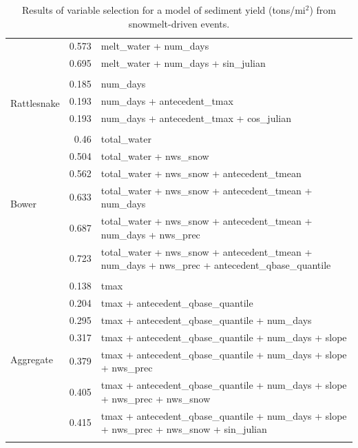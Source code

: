 \documentclass[10pt]{article}
\begin{document}
\begin{table}[h]
\begin{center}
\begin{tabular}{lrl}
 & 0.573 & melt\_water + num\_days\\ 
 & 0.695 & melt\_water + num\_days + sin\_julian\\ 
\vspace{2mm}\\ \multirow{4}{*}{Rattlesnake} & 0.185 & num\_days\\ 
 & 0.193 & num\_days + antecedent\_tmax\\ 
 & 0.193 & num\_days + antecedent\_tmax + cos\_julian\\ 
\vspace{2mm}\\ \multirow{7}{*}{Bower} & 0.46 & total\_water\\ 
 & 0.504 & total\_water + nws\_snow\\ 
 & 0.562 & total\_water + nws\_snow + antecedent\_tmean\\ 
 & 0.633 & total\_water + nws\_snow + antecedent\_tmean + num\_days\\ 
 & 0.687 & total\_water + nws\_snow + antecedent\_tmean + num\_days + nws\_prec\\ 
 & 0.723 & total\_water + nws\_snow + antecedent\_tmean + num\_days + nws\_prec + antecedent\_qbase\_quantile\\ 
\vspace{2mm}\\ \multirow{8}{*}{Aggregate} & 0.138 & tmax\\ 
 & 0.204 & tmax + antecedent\_qbase\_quantile\\ 
 & 0.295 & tmax + antecedent\_qbase\_quantile + num\_days\\ 
 & 0.317 & tmax + antecedent\_qbase\_quantile + num\_days + slope\\ 
 & 0.379 & tmax + antecedent\_qbase\_quantile + num\_days + slope + nws\_prec\\ 
 & 0.405 & tmax + antecedent\_qbase\_quantile + num\_days + slope + nws\_prec + nws\_snow\\ 
 & 0.415 & tmax + antecedent\_qbase\_quantile + num\_days + slope + nws\_prec + nws\_snow + sin\_julian\\ 
\vspace{2mm}\\     \end{tabular}
    \caption{Results of variable selection for a model of sediment yield (tons/$\text{mi}^2$) from snowmelt-driven events.\label{sed_r_square_snow}}
    \end{center}
\end{table}
\end{document}
